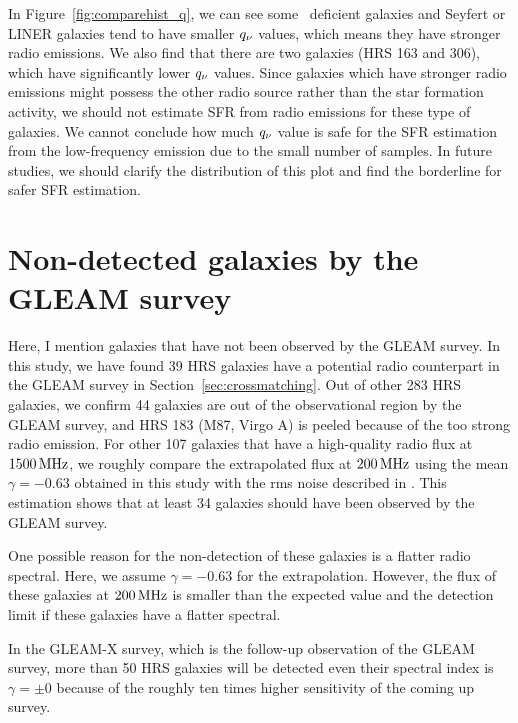 In Figure~\ref{fig:comparehist_q}, we can see some \nh~deficient galaxies and Seyfert or LINER galaxies tend to have smaller $q_{\nu}$ values, which means they have stronger radio emissions.
We also find that there are two galaxies (HRS 163 and 306), which have significantly lower $q_{\nu}$ values.
Since galaxies which have stronger radio emissions might possess the other radio source rather than the star formation activity, we should not estimate SFR from radio emissions for these type of galaxies.
We cannot conclude how much $q_{\nu}$ value is safe for the SFR estimation from the low-frequency emission due to the small number of samples.
In future studies, we should clarify the distribution of this plot and find the borderline for safer SFR estimation.


\section{Non-detected galaxies by the GLEAM survey}

Here, I mention galaxies that have not been observed by the GLEAM survey.
In this study, we have found 39 HRS galaxies have a potential radio counterpart in the GLEAM survey in Section~\ref{sec:crossmatching}.
Out of other 283 HRS galaxies, we confirm 44 galaxies are out of the observational region by the GLEAM survey, and HRS 183 (M87, Virgo A) is peeled because of the too strong radio emission.
For other 107 galaxies that have a high-quality radio flux at $1500\,\mathrm{MHz}$, we roughly compare the extrapolated flux at $200\,\mathrm{MHz}$ using the mean $\gamma = -0.63$ obtained in this study with the rms noise described in \citet{Hurley-Walker2017a}.
This estimation shows that at least 34 galaxies should have been observed by the GLEAM survey.

One possible reason for the non-detection of these galaxies is a flatter radio spectral.
Here, we assume $\gamma = -0.63$ for the extrapolation.
However, the flux of these galaxies at $200\,\mathrm{MHz}$ is smaller than the expected value and the detection limit if these galaxies have a flatter spectral.

In the GLEAM-X survey, which is the follow-up observation of the GLEAM survey, more than 50 HRS galaxies will be detected even their spectral index is $\gamma = \pm 0$ because of the roughly ten times higher sensitivity of the coming up survey.



%
%
